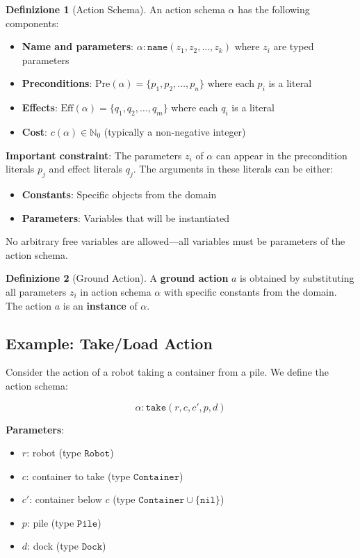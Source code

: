 \documentclass[11pt,a4paper]{article}
\theoremstyle{definition}
\newtheorem{definition}{Definizione}[section]
\theoremstyle{plain}
\theoremstyle{remark}
\begin{document}
\begin{definition}[Action Schema]
An action schema $\alpha$ has the following components:
\begin{itemize}
    \item \textbf{Name and parameters}: $\alpha: \texttt{name}(z_1, z_2, \dots, z_k)$ where $z_i$ are typed parameters
    \item \textbf{Preconditions}: $\text{Pre}(\alpha) = \{p_1, p_2, \dots, p_n\}$ where each $p_i$ is a literal
    \item \textbf{Effects}: $\text{Eff}(\alpha) = \{q_1, q_2, \dots, q_m\}$ where each $q_i$ is a literal
    \item \textbf{Cost}: $c(\alpha) \in \mathbb{N}_0$ (typically a non-negative integer)
\end{itemize}
\end{definition}

\textbf{Important constraint}: The parameters $z_i$ of $\alpha$ can appear in the precondition literals $p_j$ and effect literals $q_j$. The arguments in these literals can be either:
\begin{itemize}
    \item \textbf{Constants}: Specific objects from the domain
    \item \textbf{Parameters}: Variables that will be instantiated
\end{itemize}

No arbitrary free variables are allowed—all variables must be parameters of the action schema.

\begin{definition}[Ground Action]
A \textbf{ground action} $a$ is obtained by substituting all parameters $z_i$ in action schema $\alpha$ with specific constants from the domain. The action $a$ is an \textbf{instance} of $\alpha$.
\end{definition}

\subsection{Example: Take/Load Action}

Consider the action of a robot taking a container from a pile. We define the action schema:

\[
\alpha: \texttt{take}(r, c, c', p, d)
\]

\textbf{Parameters}:
\begin{itemize}
    \item $r$: robot (type $\texttt{Robot}$)
    \item $c$: container to take (type $\texttt{Container}$)
    \item $c'$: container below $c$ (type $\texttt{Container} \cup \{\texttt{nil}\}$)
    \item $p$: pile (type $\texttt{Pile}$)
    \item $d$: dock (type $\texttt{Dock}$)
\end{itemize}
\end{document}
